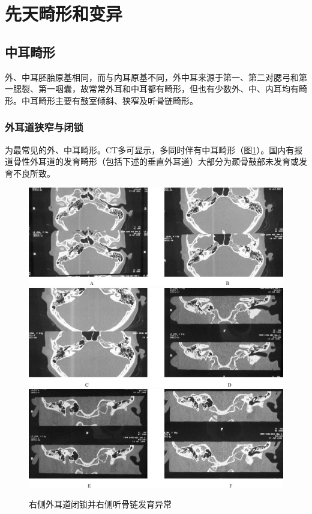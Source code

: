 \section{先天畸形和变异}

\subsection{中耳畸形}

外、中耳胚胎原基相同，而与内耳原基不同，外中耳来源于第一、第二对腮弓和第一腮裂、第一咽囊，故常常外耳和中耳都有畸形，但也有少数外、中、内耳均有畸形。中耳畸形主要有鼓室倾斜、狭窄及听骨链畸形。

\subsubsection{外耳道狭窄与闭锁}

为最常见的外、中耳畸形。CT多可显示，多同时伴有中耳畸形（图\ref{fig4-3}）。国内有报道骨性外耳道的发育畸形（包括下述的垂直外耳道）大部分为颞骨鼓部未发育或发育不良所致。





\begin{figure}[!htbp]
 \centering
 \includegraphics[width=.7\textwidth,height=\textheight,keepaspectratio]{./images/Image00117.jpg}
 \includegraphics[width=.7\textwidth,height=\textheight,keepaspectratio]{./images/Image00118.jpg}
 \includegraphics[width=.7\textwidth,height=\textheight,keepaspectratio]{./images/Image00119.jpg}
 \captionsetup{justification=centering}
 \caption{右侧外耳道闭锁并右侧听骨链发育异常}
 \label{fig4-3}
  \end{figure} 

